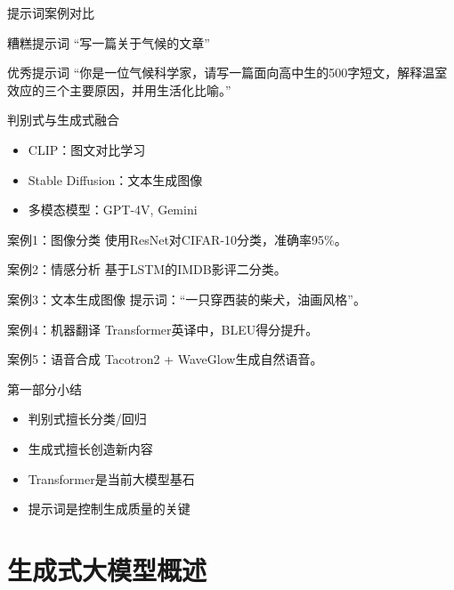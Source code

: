 \begin{frame}{提示词案例对比}
\begin{block}{糟糕提示词}
“写一篇关于气候的文章”
\end{block}
\begin{block}{优秀提示词}
“你是一位气候科学家，请写一篇面向高中生的500字短文，解释温室效应的三个主要原因，并用生活化比喻。”
\end{block}
\end{frame}

\begin{frame}{判别式与生成式融合}
\begin{itemize}
    \item CLIP：图文对比学习
    \item Stable Diffusion：文本生成图像
    \item 多模态模型：GPT-4V, Gemini
\end{itemize}
\end{frame}

\begin{frame}{案例1：图像分类}
使用ResNet对CIFAR-10分类，准确率95\%。
\end{frame}
\begin{frame}{案例2：情感分析}
基于LSTM的IMDB影评二分类。
\end{frame}
\begin{frame}{案例3：文本生成图像}
提示词：“一只穿西装的柴犬，油画风格”。
\end{frame}
\begin{frame}{案例4：机器翻译}
Transformer英译中，BLEU得分提升。
\end{frame}
\begin{frame}{案例5：语音合成}
Tacotron2 + WaveGlow生成自然语音。
\end{frame}

\begin{frame}{第一部分小结}
\begin{itemize}
    \item 判别式擅长分类/回归
    \item 生成式擅长创造新内容
    \item Transformer是当前大模型基石
    \item 提示词是控制生成质量的关键
\end{itemize}
\end{frame}

\section{生成式大模型概述}

